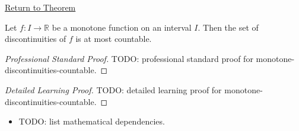 \newpage
{}
\label{prf:monotone-discontinuities-countable}

\begin{remark*}[Return]
\hyperref[thm:monotone-discontinuities-countable]{Return to Theorem}
\end{remark*}

\begin{theorem*}
Let $f : I \to \mathbb{R}$ be a monotone function on an interval $I$. Then the set of discontinuities of $f$ is at most countable.
\end{theorem*}

\begin{proof}[Professional Standard Proof]
\LRAProofBodyStart
TODO: professional standard proof for monotone-discontinuities-countable.
\end{proof}

\begin{proof}[Detailed Learning Proof]
\LRAProofBodyStart
TODO: detailed learning proof for monotone-discontinuities-countable.
\end{proof}

\begin{remark*}
\end{remark*}

\begin{dependencies}
\begin{itemize}
  \item TODO: list mathematical dependencies.
\end{itemize}
\end{dependencies}

\clearpage
